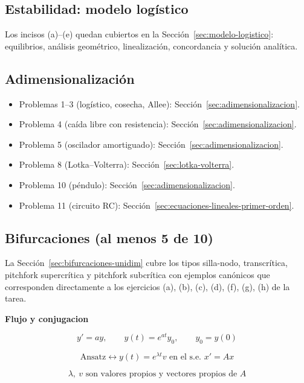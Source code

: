 \documentclass[11pt,letterpaper]{article}
\begin{document}
\subsection{Estabilidad: modelo logístico}

Los incisos (a)--(e) quedan cubiertos en la Sección~\ref{sec:modelo-logistico}:
equilibrios, análisis geométrico, linealización, concordancia y solución analítica.

\subsection{Adimensionalización}

\begin{itemize}
    \item Problemas 1--3 (logístico, cosecha, Allee): Sección~\ref{sec:adimensionalizacion}.
    \item Problema 4 (caída libre con resistencia): Sección~\ref{sec:adimensionalizacion}.
    \item Problema 5 (oscilador amortiguado): Sección~\ref{sec:adimensionalizacion}.
    \item Problema 8 (Lotka--Volterra): Sección~\ref{sec:lotka-volterra}.
    \item Problema 10 (péndulo): Sección~\ref{sec:adimensionalizacion}.
    \item Problema 11 (circuito RC): Sección~\ref{sec:ecuaciones-lineales-primer-orden}.
\end{itemize}

\subsection{Bifurcaciones (al menos 5 de 10)}

La Sección~\ref{sec:bifurcaciones-unidim} cubre los tipos silla-nodo,
transcrítica, pitchfork supercrítica y pitchfork subcrítica con ejemplos
canónicos que corresponden directamente a los ejercicios (a), (b), (c), (d),
(f), (g), (h) de la tarea.

\newpage

\textbf{Flujo y conjugacion}

\[
y' = ay, \qquad y(t)=e^{at}y_0, \qquad y_0=y(0)
\]

\[
\text{Ansatz} \leftrightarrow y(t)=e^{\lambda t}v \text{ en el s.e. } x'=Ax
\]

\[
\lambda,\ v \text{ son valores propios y vectores propios de } A
\]
\end{document}
